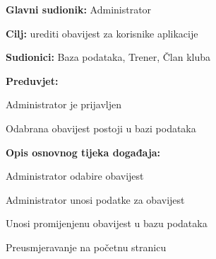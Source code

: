 \documentclass[times, utf8, zavrsni]{fer}
\newenvironment{packed_enum}{
	\begin{enumerate}
		\setlength{\itemsep}{0pt}
		\setlength{\parskip}{0pt}
		\setlength{\parsep}{0pt}
	}{\end{enumerate}}
\newenvironment{packed_item}{
	\begin{itemize}
		\setlength{\itemsep}{0pt}
		\setlength{\parskip}{0pt}
		\setlength{\parsep}{0pt}
	}{\end{itemize}}
\begin{document}
            \noindent {}
					\begin{packed_item}
						
						\item \textbf{Glavni sudionik: } Administrator
						\item  \textbf{Cilj:} urediti obavijest za korisnike aplikacije
						\item  \textbf{Sudionici:} Baza podataka, Trener, Član kluba
						\item  \textbf{Preduvjet:} 
						
						\item[] \begin{packed_enum}
							
							\item Administrator je prijavljen
							\item Odabrana obavijest postoji u bazi podataka
							
							
						\end{packed_enum}
						\item  \textbf{Opis osnovnog tijeka događaja:}
						
						\item[] \begin{packed_enum}
							
							\item Administrator odabire obavijest
							\item Administrator unosi podatke za obavijest 
							\item Unosi promijenjenu obavijest u bazu podataka
							\item Preusmjeravanje na početnu stranicu
							
							
						\end{packed_enum}
						
					\end{packed_item}
					
\end{document}
